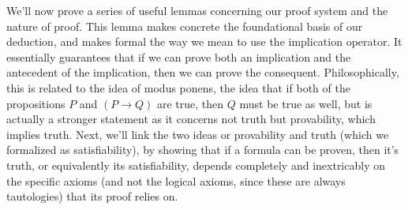 \documentclass{article}
\begin{document}
\nn
We'll now prove a series of useful lemmas concerning our proof system and the nature of proof.
This lemma makes concrete the foundational basis of our deduction, and makes formal the way we mean to use the implication operator. It essentially guarantees that if we can prove both an implication and the antecedent of the implication, then we can prove the consequent. Philosophically, this is related to the idea of modus ponens, the idea that if both of the propositions $ P $ and $ (P \rightarrow Q) $ are true, then $ Q $ must be true as well, but is actually a stronger statement as it concerns not truth but provability, which implies truth.
\nn
Next, we'll link the two ideas or provability and truth (which we formalized as satisfiability), by showing that if a formula can be proven, then it's truth, or equivalently its satisfiability, depends completely and inextricably on the specific axioms (and not the logical axioms, since these are always tautologies) that its proof relies on.
\end{document}
